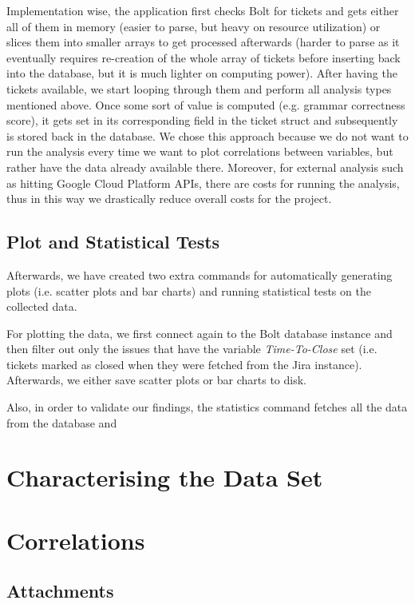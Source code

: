 \documentclass{mpaper}
\begin{document}
Implementation wise, the application first checks Bolt for tickets and gets either all of them in memory (easier to parse, 
but heavy on resource utilization) or slices them into smaller arrays to get processed afterwards (harder to parse as it 
eventually requires re-creation of the whole array of tickets before inserting back into the database, but it is much 
lighter on computing power). After having the tickets available, we start looping through them and perform all 
analysis types mentioned above. Once some sort of value is computed (e.g. grammar correctness score), it gets set in 
its corresponding field in the ticket struct and subsequently is stored back in the database. We chose this approach because 
we do not want to run the analysis every time we want to plot correlations between variables, but rather have the data 
already available there. Moreover, for external analysis such as hitting Google Cloud Platform APIs, there are costs for 
running the analysis, thus in this way we drastically reduce overall costs for the project. 

\subsection{Plot and Statistical Tests}

Afterwards, we have created two extra commands for automatically generating plots (i.e. scatter plots and bar charts) and 
running statistical tests on the collected data. 

For plotting the data, we first connect again to the Bolt database instance and then filter out only the issues that have 
the variable \emph{Time-To-Close} set (i.e. tickets marked as closed when they were fetched from the Jira instance). Afterwards,
we either save scatter plots or bar charts to disk. 

Also, in order to validate our findings, the statistics command fetches all the data from the database and 

\section{Characterising the Data Set}\label{characterising}

\section{Correlations}\label{correlations}

\subsection{Attachments}
\end{document}
